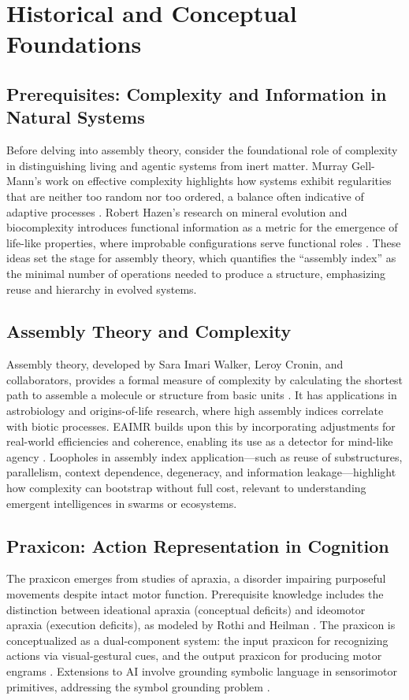 \documentclass{article}
\begin{document}
\section{Historical and Conceptual Foundations}
\label{sec:foundations}

\subsection{Prerequisites: Complexity and Information in Natural Systems}
Before delving into assembly theory, consider the foundational role of complexity in distinguishing living and agentic systems from inert matter. Murray Gell-Mann’s work on effective complexity highlights how systems exhibit regularities that are neither too random nor too ordered, a balance often indicative of adaptive processes \citep{adami2012}. Robert Hazen’s research on mineral evolution and biocomplexity introduces functional information as a metric for the emergence of life-like properties, where improbable configurations serve functional roles \citep{hazen2007}. These ideas set the stage for assembly theory, which quantifies the ``assembly index'' as the minimal number of operations needed to produce a structure, emphasizing reuse and hierarchy in evolved systems.

\subsection{Assembly Theory and Complexity}
Assembly theory, developed by Sara Imari Walker, Leroy Cronin, and collaborators, provides a formal measure of complexity by calculating the shortest path to assemble a molecule or structure from basic units \citep{cronin2016,walker2013}. It has applications in astrobiology and origins-of-life research, where high assembly indices correlate with biotic processes. EAIMR builds upon this by incorporating adjustments for real-world efficiencies and coherence, enabling its use as a detector for mind-like agency \citep{adami2012}. Loopholes in assembly index application---such as reuse of substructures, parallelism, context dependence, degeneracy, and information leakage---highlight how complexity can bootstrap without full cost, relevant to understanding emergent intelligences in swarms or ecosystems.

\subsection{Praxicon: Action Representation in Cognition}
The praxicon emerges from studies of apraxia, a disorder impairing purposeful movements despite intact motor function. Prerequisite knowledge includes the distinction between ideational apraxia (conceptual deficits) and ideomotor apraxia (execution deficits), as modeled by Rothi and Heilman \citep{mantovani2010}. The praxicon is conceptualized as a dual-component system: the input praxicon for recognizing actions via visual-gestural cues, and the output praxicon for producing motor engrams \citep{peigneux2004}. Extensions to AI involve grounding symbolic language in sensorimotor primitives, addressing the symbol grounding problem \citep{harnad1990,pastra2011,vannuscorps2023}.
\end{document}
